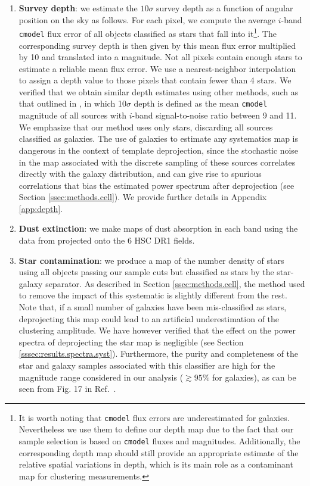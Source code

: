 \documentclass[a4paper,11pt]{article}
\begin{document}
    \begin{enumerate}
      \item {\bf Survey depth}: we estimate the $10\sigma$ survey depth as a function of angular position on the sky as follows. For each pixel, we compute the average $i$-band {\tt cmodel} flux error of all objects classified as stars that fall into it\footnote{It is worth noting that {\tt cmodel} flux errors are underestimated for galaxies. Nevertheless we use them to define our depth map due to the fact that our sample selection is based on {\tt cmodel} fluxes and magnitudes. Additionally, the corresponding depth map should still provide an appropriate estimate of the relative spatial variations in depth, which is its main role as a contaminant map for clustering measurements.}. The corresponding survey depth is then given by this mean flux error multiplied by 10 and translated into a magnitude. Not all pixels contain enough stars to estimate a reliable mean flux error. We use a nearest-neighbor interpolation to assign a depth value to those pixels that contain fewer than 4 stars. We verified that we obtain similar depth estimates using other methods, such as that outlined in \cite{2018PASJ...70S..25M}, in which 10$\sigma$ depth is defined as the mean {\tt cmodel} magnitude of all sources with $i$-band signal-to-noise ratio between 9 and 11. We emphasize that our method uses only stars, discarding all sources classified as galaxies. The use of galaxies to estimate any systematics map is dangerous in the context of template deprojection, since the stochastic noise in the map associated with the discrete sampling of these sources correlates directly with the galaxy distribution, and can give rise to spurious correlations that bias the estimated power spectrum after deprojection (see Section \ref{ssec:methods.cell}). We provide further details in Appendix \ref{app:depth}.
      \item {\bf Dust extinction}: we make maps of dust absorption in each band using the data from \cite{1998ApJ...500..525S} projected onto the 6 HSC DR1 fields.
      \item {\bf Star contamination}: we produce a map of the number density of stars using all objects passing our sample cuts but classified as stars by the star-galaxy separator. As described in Section \ref{ssec:methods.cell}, the method used to remove the impact of this systematic is slightly different from the rest. Note that, if a small number of galaxies have been mis-classified as stars, deprojecting this map could lead to an artificial underestimation of the clustering amplitude. We have however verified that the effect on the power spectra of deprojecting the star map is negligible (see Section \ref{sssec:results.spectra.syst}). Furthermore, the purity and completeness of the star and galaxy samples associated with this classifier are high for the magnitude range considered in our analysis ($\gtrsim 95 \%$ for galaxies), as can be seen from Fig. 17 in Ref.~\cite{2018PASJ...70S...5B}.

\end{enumerate}
\end{document}
